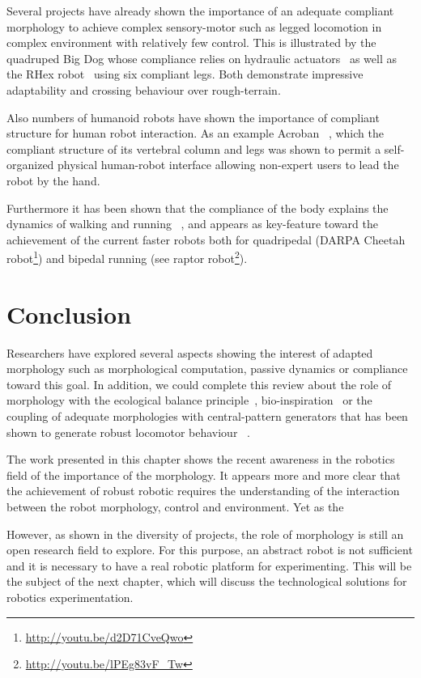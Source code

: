 Several projects have already shown the importance of an adequate compliant morphology to achieve complex sensory-motor such as legged locomotion in complex environment with relatively few control.  This is illustrated by the quadruped Big Dog whose compliance relies on hydraulic actuators~\cite{raibert2008bigdog} as well as the RHex robot~\cite{saranli2001rhex} using six compliant legs. Both demonstrate impressive adaptability and crossing behaviour over rough-terrain.

\begin{figure}[tb]
\centering
    \hfil
    \caption{}
    \label{fig:compliant_robot}
\end{figure}

Also numbers of humanoid robots have shown the importance of compliant structure for human robot interaction. As an example Acroban~\cite{Ly2011bio} \cite{Oudeyer2011}, which the compliant structure of its vertebral column and legs was shown to permit a self-organized physical human-robot interface allowing non-expert users to lead the robot by the hand.

Furthermore it has been shown that the compliance of the body explains the dynamics of walking and running~\cite{Geyer2006} \cite{iida2007bipedal}, and appears as key-feature toward the achievement of the current faster robots both for quadripedal (DARPA Cheetah robot\footnote{\url{http://youtu.be/d2D71CveQwo}}) and bipedal running (see raptor robot\footnote{\url{http://youtu.be/lPEg83vF_Tw}}).



\section{Conclusion} %

Researchers have explored several aspects showing the interest of adapted morphology such as morphological computation, passive dynamics or compliance toward this goal. In addition, we could complete this review about the role of morphology with the ecological balance principle~\cite{pfeifer2005new}, bio-inspiration~\cite{scarfogliero2009use} \cite{pfeifer2007self} or the coupling of adequate morphologies with central-pattern generators that has been shown to generate robust locomotor behaviour~\cite{ijspeert2007swimming} \cite{steingrube2010self}.

The work presented in this chapter shows the recent awareness in the robotics field of the importance of the morphology. It appears more and more clear that the achievement of robust robotic requires the understanding of the interaction between the robot morphology, control and environment. Yet as the

However, as shown in the diversity of projects, the role of morphology is still an open research field to explore. For this purpose, an abstract robot is not sufficient and it is necessary to have a real robotic platform for experimenting. This will be the subject of the next chapter, which will discuss the technological solutions for robotics experimentation.
